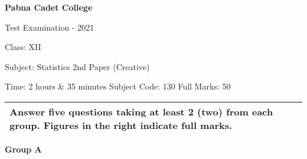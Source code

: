 \documentclass{article}
\begin{document}
\begin{center}
  \bfseries\large
  Pabna Cadet College

\normalsize
  Test Examination - 2021

  Class: XII

  Subject: Statistics 2nd Paper (Creative)

  Time: 2 hours \& 35 minutes \qquad \qquad Subject Code: 130  \qquad  \qquad Full Marks: 50

\end{center}

\noindent
\begin{tabular}{p{\dimexpr\linewidth-2\tabcolsep}}
  Answer five questions taking at least 2 (two) from each group. Figures in the right indicate full marks.\\
  \hline
\end{tabular}

\begin{center}
\textbf{Group A}
\end{center}
\end{document}
